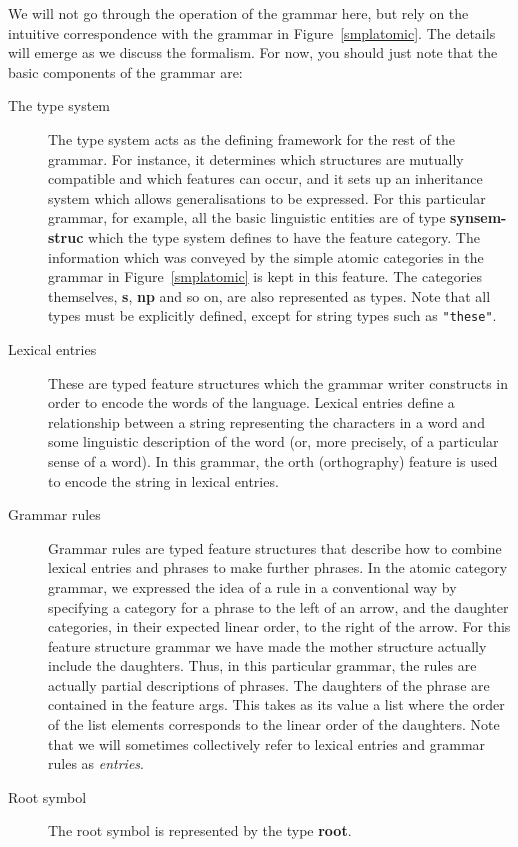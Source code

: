 \documentclass[12pt]{report}
\begin{document}
We will not go through the operation
of the grammar here, but rely on the intuitive correspondence
with the grammar in Figure~\ref{smplatomic}.
The details will emerge as we discuss the
formalism.
For now, you should just note that 
the basic components of the grammar are:
\begin{description}
\item[The type system]  The type system acts as the defining
framework for the rest of the grammar.  For instance,
it determines which structures
are mutually compatible and which features can occur, and it sets
up an inheritance system which allows generalisations to be 
expressed.  For this particular grammar, for example,
all the basic linguistic entities
are of type {\bf synsem-struc} which the type system defines
to have the feature {\sc category}.
The information which was conveyed by the simple atomic categories
in the grammar in Figure~\ref{smplatomic}
is kept in this feature.
The categories themselves, {\bf s}, {\bf np} and so
on, are also represented as types. 
Note that all types must be explicitly defined, except for
string types such as {\tt "these"}.
\item[Lexical entries]  These are typed feature structures
which the grammar writer constructs in order to encode the words
of the language.  Lexical entries define a relationship 
between a string representing the characters in a word
and some linguistic description of the word (or, more precisely,
of a particular sense of a word).
In this grammar,
the {\sc orth} (orthography)
feature is used to encode the string in lexical 
entries.  
\item[Grammar rules]
Grammar rules are typed feature structures that
describe how to combine lexical entries and phrases
to make further phrases.  In the atomic category grammar, we expressed 
the idea of a rule in a conventional way by specifying 
a category for a phrase
to the left of an arrow, and the daughter categories, in their
expected linear order, to the right of the arrow.
For this feature structure grammar
we have made the mother structure actually
include the daughters.  Thus, in this particular
grammar, the rules are actually partial descriptions
of phrases.  The daughters of the phrase are
contained in the feature {\sc args}.  This takes as its value a list
where the order of the list elements
corresponds
to the linear order of the daughters.  
Note that we will sometimes collectively refer to lexical entries
and grammar rules as {\it entries}.
\item[Root symbol]
The root symbol is represented by the type {\bf root}.
\end{description}
\end{document}
